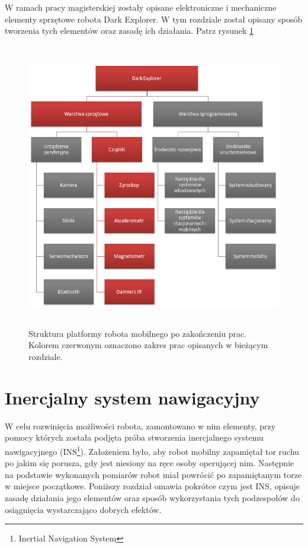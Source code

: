 W ramach pracy magisterskiej zostały opisane elektroniczne i mechaniczne elementy
sprzętowe robota Dark Explorer. W tym rozdziale został opisany sposób tworzenia
tych elementów oraz zasadę ich działania. Patrz rysunek
\ref{fig:DarkExplorerPlatformHardware}

\begin{figure}[!ht]
 \centering
 \includegraphics[height=125mm]{../images/ch04/dark_explorer_platform_hardware.png}
 \caption{Struktura platformy robota mobilnego po zakończeniu prac. Kolorem
 czerwonym oznaczono zakres prac opisanych w bieżącym rozdziale.}
 \label{fig:DarkExplorerPlatformHardware}
\end{figure}

\section{Inercjalny system nawigacyjny}
\label{sec:ins}
W celu rozwinięcia możliwości robota, zamontowano w nim elementy, przy pomocy
których została podjęta próba stworzenia inercjalnego systemu nawigacyjnego
(INS\footnote{Inertial Navigation System}). Założeniem było, aby robot mobilny
zapamiętał tor ruchu po jakim się porusza, gdy jest niesiony na ręce osoby
operującej nim. Następnie na podstawie wykonanych pomiarów robot miał powrócić po
zapamiętanym torze w miejsce początkowe. Poniższy rozdział omawia pokrótce czym
jest INS, opisuje zasadę działania jego elementów oraz sposób wykorzystania tych
podzespołów do osiągnięcia wystarczająco dobrych efektów.

